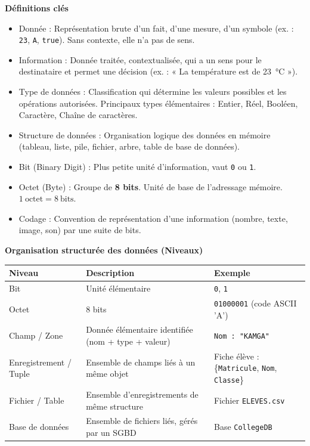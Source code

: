 \documentclass[11pt]{article}
\newcommand{\cle}[1]{{\popxbold\color{popdark}#1}}
\begin{document}
\begin{bilan}

\par\medskip\textbf{Définitions clés}\par

\begin{itemize}
  \item \cle{Donnée} : Représentation brute d'un fait, d'une mesure, d'un symbole (ex. : \texttt{23}, \texttt{A}, \texttt{true}). Sans contexte, elle n'a pas de sens.
  \item \cle{Information} : Donnée traitée, contextualisée, qui a un sens pour le destinataire et permet une décision (ex. : « La température est de \SI{23}{\celsius} »).
  \item \cle{Type de données} : Classification qui détermine les valeurs possibles et les opérations autorisées. Principaux types élémentaires : \cle{Entier}, \cle{Réel}, \cle{Booléen}, \cle{Caractère}, \cle{Chaîne de caractères}.
  \item \cle{Structure de données} : Organisation logique des données en mémoire (tableau, liste, pile, fichier, arbre, table de base de données).
  \item \cle{Bit} (Binary Digit) : Plus petite unité d'information, vaut \texttt{0} ou \texttt{1}.
  \item \cle{Octet} (Byte) : Groupe de \textbf{8 bits}. Unité de base de l'adressage mémoire. $1\ \text{octet} = 8\ \text{bits}$.
  \item \cle{Codage} : Convention de représentation d'une information (nombre, texte, image, son) par une suite de bits.
\end{itemize}

\par\medskip\textbf{Organisation structurée des données (Niveaux)}\par

\begin{center}
\begin{tabularx}{\linewidth}{|l|X|l|}
\hline
\rowcolor{popblueL}
\textbf{Niveau} & \textbf{Description} & \textbf{Exemple} \\
\hline
Bit & Unité élémentaire & \texttt{0}, \texttt{1} \\
\hline
Octet & 8 bits & \texttt{01000001} (code ASCII 'A') \\
\hline
Champ / Zone & Donnée élémentaire identifiée (nom + type + valeur) & \texttt{Nom : "KAMGA"} \\
\hline
Enregistrement / Tuple & Ensemble de champs liés à un même objet & Fiche élève : \{\texttt{Matricule}, \texttt{Nom}, \texttt{Classe}\} \\
\hline
Fichier / Table & Ensemble d'enregistrements de même structure & Fichier \texttt{ELEVES.csv} \\
\hline
Base de données & Ensemble de fichiers liés, gérés par un SGBD & Base \texttt{CollegeDB} \\
\hline
\end{tabularx}
\end{center}


\end{bilan}
\end{document}
